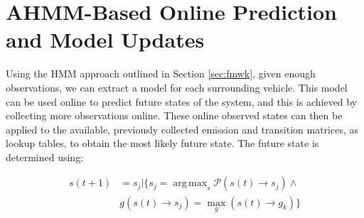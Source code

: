 \documentclass[letterpaper, 10 pt, conference]{ieeeconf}  %
\DeclareMathOperator*{\argmax}{arg\,max}
\newcommand\NB[1]{$\spadesuit$\footnote{NB: #1}}
\begin{document}
\section{AHMM-Based Online Prediction and Model Updates} \label{sec:ahmmpredupdate} %
  Using the HMM approach outlined in Section \ref{sec:fmwk}, given enough observations, we can extract a model for each surrounding vehicle. This model can be used online to predict future states of the system, and this is achieved by collecting more observations online. These online observed states can then be applied to the available, previously collected emission and transition matrices, as lookup tables, to obtain the most likely future state. The future state is determined using:

\begin{align} \label{eq:pred}
   s(t+1) &= s_j \vert \{s_j = \argmax_s \mathcal{P}(s(t)\to s_j) \land \nonumber \\ 
   & g(s(t)\to s_j) = \max_g(s(t)\to g_k)\}
\end{align}
\end{document}
